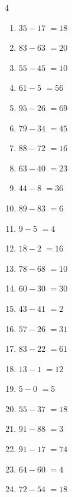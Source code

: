 \begin{multicols}{4}
\begin{enumerate}
  \item $35-17$
        $=18$

  \item $83-63$
        $=20$

  \item $55-45$
        $=10$

\columnbreak %

  \item $61-5$
        $=56$

  \item $95-26$
        $=69$

  \item $79-34$
        $=45$

  \item $88-72$
        $=16$

  \item $63-40$
        $=23$

  \item $44-8$
        $=36$

  \item $89-83$
        $=6$

  \item $9-5$
        $=4$

  \item $18-2$
        $=16$

  \item $78-68$
        $=10$

  \item $60-30$
        $=30$

  \item $43-41$
        $=2$

  \item $57-26$
        $=31$

  \item $83-22$
        $=61$

  \item $13-1$
        $=12$

  \item $5-0$
        $=5$

  \item $55-37$
        $=18$

  \item $91-88$
        $=3$

  \item $91-17$
        $=74$

  \item $64-60$
        $=4$

  \item $72-54$
        $=18$


\end{enumerate}
\end{multicols}
